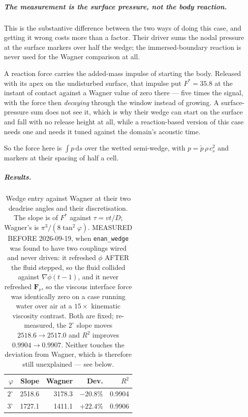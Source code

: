 \documentclass[11pt,a4paper]{article}
\newcommand{\code}[1]{\texttt{\small #1}}
\begin{document}
\subparagraph{The measurement is the surface pressure, not the body reaction.}
This is the substantive difference between the two ways of doing this case, and
getting it wrong costs more than a factor. Their driver sums the nodal pressure
at the surface markers over half the wedge; the immersed-boundary reaction is
never used for the Wagner comparison at all.

A reaction force carries the added-mass impulse of starting the body. Released
with its apex on the undisturbed surface, that impulse put $F^*=35.8$ at the
instant of contact against a Wagner value of zero there --- five times the
signal, with the force then \emph{decaying} through the window instead of
growing. A surface-pressure sum does not see it, which is why their wedge can
start on the surface and fall with no release height at all, while a
reaction-based version of this case needs one and needs it tuned against the
domain's acoustic time.

So the force here is $\int p\,\mathrm{d}s$ over the wetted semi-wedge, with
$p = \tilde p\,\rho\,c_s^2$ and markers at their spacing of half a cell.

\subparagraph{Results.}

\begin{table}[htbp]
  \centering
  \caption{Wedge entry against Wagner at their two deadrise angles and their
  discretisation. The slope is of $F^*$ against $\tau=vt/D$; Wagner's is
  $\pi^3/(8\tan^2\varphi)$. MEASURED BEFORE 2026-09-19, when \code{enan\_wedge}
  was found to have two couplings wired and never driven: it refreshed $\phi$
  AFTER the fluid stepped, so the fluid collided against $\nabla\phi(t-1)$, and
  it never refreshed $\bm{F}_\nu$, so the viscous interface force was identically
  zero on a case running water over air at a $15\times$ kinematic viscosity
  contrast. Both are fixed; re-measured, the $2^\circ$ slope moves $2518.6 \to
  2517.0$ and $R^2$ improves $0.9904 \to 0.9907$. Neither touches the deviation
  from Wagner, which is therefore still unexplained --- see below.}
  \label{tab:enanwedge}
  \begin{tabular}{rrrrr}
    \toprule
    $\varphi$ & Slope & Wagner & Dev. & $R^2$ \\
    \midrule
    $2^\circ$ & 2518.6 & 3178.3 & $-20.8$\% & 0.9904 \\
    $3^\circ$ & 1727.1 & 1411.1 & $+22.4$\% & 0.9906 \\
    \bottomrule
  \end{tabular}
\end{table}
\end{document}
